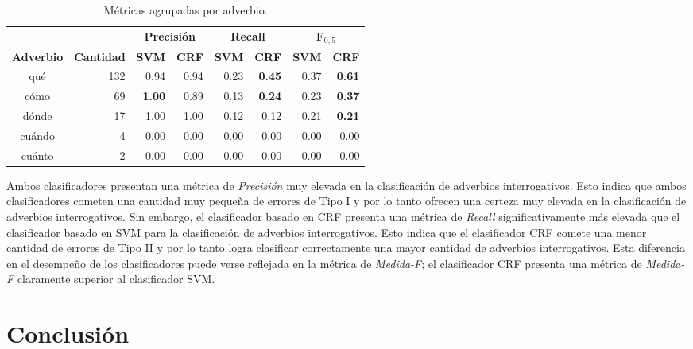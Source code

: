 \documentclass[runningheads,a4paper]{llncs}
\begin{document}
\begin{table}[ht]
 	\renewcommand{\arraystretch}{1.3}
	\renewcommand{\tabcolsep}{3pt}
	\caption{Métricas agrupadas por adverbio.}
	\label{table:metricas-adv}
	\centering
	\begin{tabular}{c r r r r r r r}
		\hline
		\multicolumn{2}{c}{} 
			& \multicolumn{2}{c}{\textbf{Precisión}} 
			& \multicolumn{2}{c}{\textbf{Recall}} 
			& \multicolumn{2}{c}{\textbf{F$_{0,5}$}} \\
		\multicolumn{1}{c}{\textbf{Adverbio}} & \multicolumn{1}{c}{\textbf{Cantidad}}
			& \multicolumn{1}{r}{\textbf{SVM}} & \multicolumn{1}{r}{\textbf{CRF}}
			& \multicolumn{1}{r}{\textbf{SVM}} & \multicolumn{1}{r}{\textbf{CRF}}
			& \multicolumn{1}{r}{\textbf{SVM}} & \multicolumn{1}{r}{\textbf{CRF}} \\		
		\hline\hline
		qué & 132 	& 0.94 & 0.94 			& 0.23 & \textbf{0.45} 	& 0.37 & \textbf{0.61} \\
		cómo & 69 	& \textbf{1.00} & 0.89 	& 0.13 & \textbf{0.24} 	& 0.23 & \textbf{0.37} \\
		dónde & 17 	& 1.00 & 1.00 			& 0.12 & 0.12			& 0.21 & \textbf{0.21} \\
		cuándo & 4 	& 0.00 & 0.00 			& 0.00 & 0.00 			& 0.00 & 0.00 \\
		cuánto & 2 	& 0.00 & 0.00 			& 0.00 & 0.00 			& 0.00 & 0.00 \\
		\hline
	\end{tabular}
\end{table}

Ambos clasificadores presentan una métrica de \emph{Precisión} muy elevada en la clasificación de adverbios interrogativos. Esto indica que ambos clasificadores cometen una cantidad muy pequeña de errores de Tipo I y por lo tanto ofrecen una certeza muy elevada en la clasificación de adverbios interrogativos. Sin embargo, el clasificador basado en CRF presenta una m\'etrica de \emph{Recall} significativamente m\'as elevada que el clasificador basado en SVM para la clasificaci\'on de adverbios interrogativos. Esto indica que el clasificador CRF comete una menor cantidad de errores de Tipo II y por lo tanto logra clasificar correctamente una mayor cantidad de adverbios interrogativos. Esta diferencia en el desempeño de los clasificadores puede verse reflejada en la m\'etrica de \emph{Medida-F}; el clasificador CRF presenta una m\'etrica de \emph{Medida-F} claramente superior al clasificador SVM.

\section{Conclusión}
\label{sec:Conclusiones}
\end{document}
